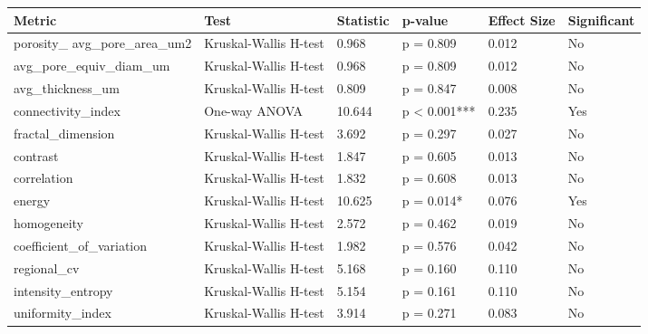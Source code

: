 \begin{tabular}{llllll}
\toprule
Metric & Test & Statistic & p-value & Effect Size & Significant \\
\midrule
porosity_%
avg_pore_area_um2 & Kruskal-Wallis H-test & 0.968 & p = 0.809 & 0.012 & No \\
avg_pore_equiv_diam_um & Kruskal-Wallis H-test & 0.968 & p = 0.809 & 0.012 & No \\
avg_thickness_um & Kruskal-Wallis H-test & 0.809 & p = 0.847 & 0.008 & No \\
connectivity_index & One-way ANOVA & 10.644 & p < 0.001*** & 0.235 & Yes \\
fractal_dimension & Kruskal-Wallis H-test & 3.692 & p = 0.297 & 0.027 & No \\
contrast & Kruskal-Wallis H-test & 1.847 & p = 0.605 & 0.013 & No \\
correlation & Kruskal-Wallis H-test & 1.832 & p = 0.608 & 0.013 & No \\
energy & Kruskal-Wallis H-test & 10.625 & p = 0.014* & 0.076 & Yes \\
homogeneity & Kruskal-Wallis H-test & 2.572 & p = 0.462 & 0.019 & No \\
coefficient_of_variation & Kruskal-Wallis H-test & 1.982 & p = 0.576 & 0.042 & No \\
regional_cv & Kruskal-Wallis H-test & 5.168 & p = 0.160 & 0.110 & No \\
intensity_entropy & Kruskal-Wallis H-test & 5.154 & p = 0.161 & 0.110 & No \\
uniformity_index & Kruskal-Wallis H-test & 3.914 & p = 0.271 & 0.083 & No \\
\bottomrule
\end{tabular}
